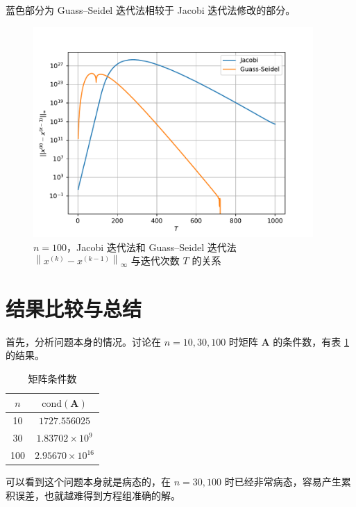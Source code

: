 \documentclass{sjtuarticle}
\begin{document}
蓝色部分为 Guass--Seidel 迭代法相较于 Jacobi 迭代法修改的部分。

\begin{figure}[h]
    \centering
    \includegraphics[height=8cm]{pic/iter.pdf}
    \caption{$n=100$，Jacobi 迭代法和 Guass--Seidel 迭代法 $\left\lVert x^{(k)}-x^{(k-1)}\right\rVert_\infty$ 与迭代次数 $T$ 的关系}
    \label{fig:iter}
\end{figure}

\section{结果比较与总结}

首先，分析问题本身的情况。讨论在 $n=10,30,100$ 时矩阵 $\bm{A}$ 的条件数，有表 \ref{tab:cond} 的结果。

\begin{table}[H]
    \centering
    \caption{矩阵条件数}
    \label{tab:cond}
    \begin{tabular}{cc}
        \toprule
        $n$ & $\text{cond}(\bm{A})$ \\
        \midrule
        10 & $1727.556025$ \\
        30 & $1.83702\times 10^9$ \\
        100 & $2.95670\times 10^{16}$ \\
        \bottomrule
    \end{tabular}    
\end{table}

可以看到这个问题本身就是病态的，在 $n=30,100$ 时已经非常病态，容易产生累积误差，也就越难得到方程组准确的解。
\end{document}
